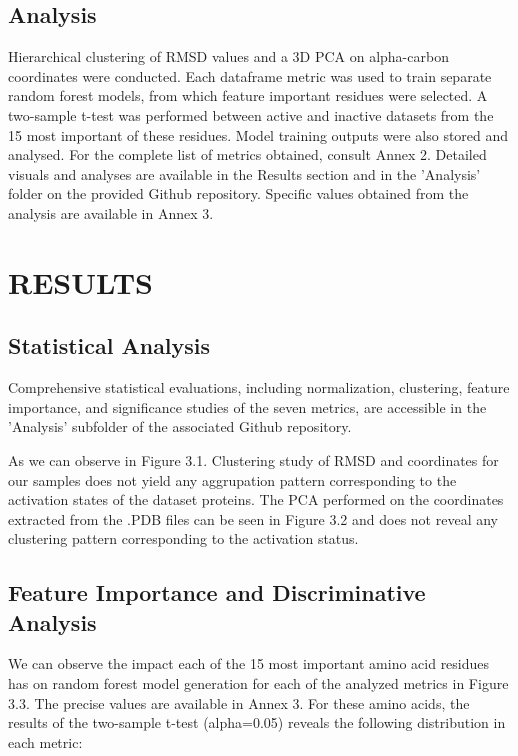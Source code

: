 \documentclass{article}
\begin{document}
\subsection{Analysis}
Hierarchical clustering of RMSD values and a 3D PCA on alpha-carbon coordinates were conducted. Each dataframe metric was used to train separate random forest models, from which feature important residues were selected. A two-sample t-test was performed between active and inactive datasets from the 15 most important of these residues. Model training outputs were also stored and analysed. For the complete list of metrics obtained, consult Annex 2. 
Detailed visuals and analyses are available in the Results section and in the 'Analysis' folder on the provided Github repository. Specific values obtained from the analysis are available in Annex 3.


\section{RESULTS}

\subsection{Statistical Analysis}

Comprehensive statistical evaluations, including normalization, clustering, feature importance, and significance studies of the seven metrics, are accessible in the 'Analysis' subfolder of the associated Github repository.

As we can observe in Figure 3.1. Clustering study of RMSD and coordinates for our samples does not yield any aggrupation pattern corresponding to the activation states of the dataset proteins. The PCA performed on the coordinates extracted from the .PDB files can be seen in Figure 3.2 and does not reveal any clustering pattern corresponding to the activation status.

\subsection{Feature Importance and Discriminative Analysis}

We can observe the impact each of the 15 most important amino acid residues has on random forest model generation for each of the analyzed metrics in Figure 3.3. The precise values are available in Annex 3. For these amino acids, the results of the two-sample t-test (alpha=0.05) reveals the following distribution in each metric:
\end{document}
